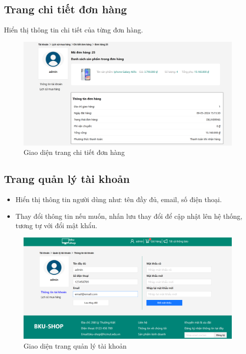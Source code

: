 \subsection{Trang chi tiết đơn hàng}
\noindent Hiển thị thông tin chi tiết của từng đơn hàng.
\begin{figure}[H]
    \begin{center}
    \includegraphics[scale=0.4]{images/hieu/chap-5/ordered-detail.png}
    \vspace*{3mm}
    \caption{Giao diện trang chi tiết đơn hàng}
    \end{center}
\end{figure}
\subsection{Trang quản lý tài khoản}
\begin{itemize}
    \item Hiển thị thông tin người dùng như: tên đầy đủ, email, số điện thoại.
    \item Thay đổi thông tin nếu muốn, nhấn lưu thay đổi để cập nhật lên hệ thống, tương tự với đổi mật khẩu.
\end{itemize}

\begin{figure}[H]
    \begin{center}
    \includegraphics[scale=0.4]{images/hieu/chap-5/account.png}
    \vspace*{3mm}
    \caption{Giao diện trang quản lý tài khoản}
    \end{center}
\end{figure}
